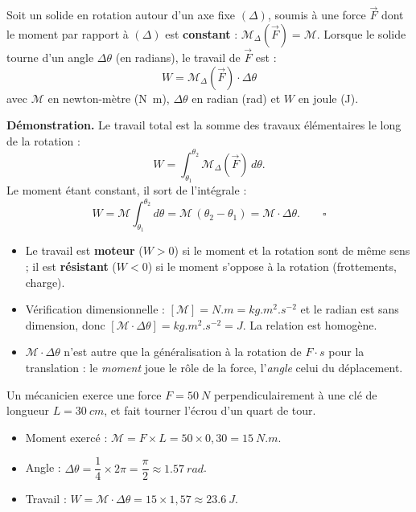 \documentclass[11pt]{article}
\begin{document}
\begin{propriete}
Soit un solide en rotation autour d'un axe fixe $(\Delta)$, soumis à une force $\vec{F}$ dont le moment par rapport à $(\Delta)$ est \textbf{constant} : $\mathcal{M}_{\Delta}(\vec{F}) = \mathcal{M}$. Lorsque le solide tourne d'un angle $\Delta\theta$ (en radians), le travail de $\vec{F}$ est :
\[
W = \mathcal{M}_{\Delta}(\vec{F}) \cdot \Delta\theta
\]
avec $\mathcal{M}$ en newton-mètre (\si{N.m}), $\Delta\theta$ en radian (\si{rad}) et $W$ en joule (\si{J}).

\textbf{Démonstration.} Le travail total est la somme des travaux élémentaires le long de la rotation :
\[
W = \int_{\theta_1}^{\theta_2} \mathcal{M}_{\Delta}(\vec{F}) \, d\theta.
\]
Le moment étant constant, il sort de l'intégrale :
\[
W = \mathcal{M} \int_{\theta_1}^{\theta_2} d\theta = \mathcal{M} \, (\theta_2 - \theta_1) = \mathcal{M} \cdot \Delta\theta. \qquad \square
\]
\end{propriete}

\begin{aretenir}
\begin{itemize}
\item Le travail est \textbf{moteur} ($W > 0$) si le moment et la rotation sont de même sens ; il est \textbf{résistant} ($W < 0$) si le moment s'oppose à la rotation (frottements, charge).
\item Vérification dimensionnelle : $[\mathcal{M}] = \si{N.m} = \si{kg.m^2.s^{-2}}$ et le radian est sans dimension, donc $[\mathcal{M} \cdot \Delta\theta] = \si{kg.m^2.s^{-2}} = \si{J}$. La relation est homogène.
\item $\mathcal{M} \cdot \Delta\theta$ n'est autre que la généralisation à la rotation de $F \cdot s$ pour la translation : le \emph{moment} joue le rôle de la force, l'\emph{angle} celui du déplacement.
\end{itemize}
\end{aretenir}

\begin{exemplebox}
Un mécanicien exerce une force $F = \SI{50}{N}$ perpendiculairement à une clé de longueur $L = \SI{30}{cm}$, et fait tourner l'écrou d'un quart de tour.
\begin{itemize}
\item Moment exercé : $\mathcal{M} = F \times L = 50 \times 0,30 = \SI{15}{N.m}$.
\item Angle : $\Delta\theta = \dfrac{1}{4} \times 2\pi = \dfrac{\pi}{2} \approx \SI{1,57}{rad}$.
\item Travail : $W = \mathcal{M} \cdot \Delta\theta = 15 \times 1,57 \approx \SI{23,6}{J}$.
\end{itemize}
\end{exemplebox}
\end{document}
